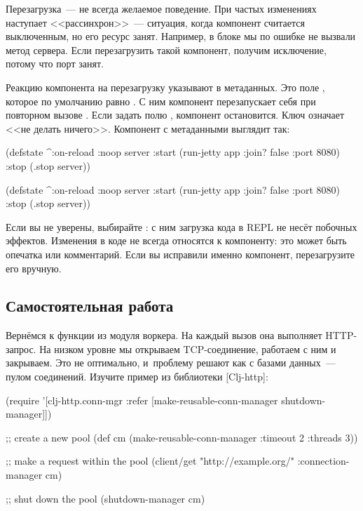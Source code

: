 Перезагрузка~--- не всегда желаемое поведение. При частых изменениях наступает
<<рассинхрон>>~--- ситуация, когда компонент считается выключенным, но его
ресурс занят. Например, в блоке  мы по ошибке не вызвали метод
 сервера. Если перезагрузить такой компонент, получим исключение,
потому что порт занят.

Реакцию компонента на перезагрузку указывают в метаданных. Это поле
, которое по умолчанию равно . С ним компонент
перезапускает себя при повторном вызове . Если задать полю
, компонент остановится. Ключ  означает <<не делать
ничего>>. Компонент с метаданными выглядит так:

\pagebreaklarge

\ifnarrow

\begin{clojure}
(defstate
  ^{:on-reload :noop}
  server
  :start (run-jetty app
           {:join? false :port 8080})
  :stop (.stop server))
\end{clojure}

\else

\begin{clojure}
(defstate
  ^{:on-reload :noop}
  server
  :start (run-jetty app {:join? false :port 8080})
  :stop (.stop server))
\end{clojure}

\fi

Если вы не уверены, выбирайте : с ним загрузка кода в REPL не несёт
побочных эффектов. Изменения в коде не всегда относятся к компоненту: это может
быть опечатка или комментарий. Если вы исправили именно компонент, перезагрузите
его вручную.

\subsection{Самостоятельная работа}


Вернёмся к функции  из модуля воркера. На каждый вызов она
выполняет HTTP-запрос. На низком уровне мы открываем TCP-соединение, работаем с
ним и закрываем. Это не оптимально, и~проблему решают как с базами данных~---
пулом соединений. Изучите пример из библиотеки
[Clj-http]:

\ifnarrow

\begin{clojure}
(require
 '[clj-http.conn-mgr :refer
   [make-reusable-conn-manager
    shutdown-manager]])

;; create a new pool
(def cm (make-reusable-conn-manager
         {:timeout 2 :threads 3}))

;; make a request within the pool
(client/get "http://example.org/"
            {:connection-manager cm})

;; shut down the pool
(shutdown-manager cm)
\end{clojure}

